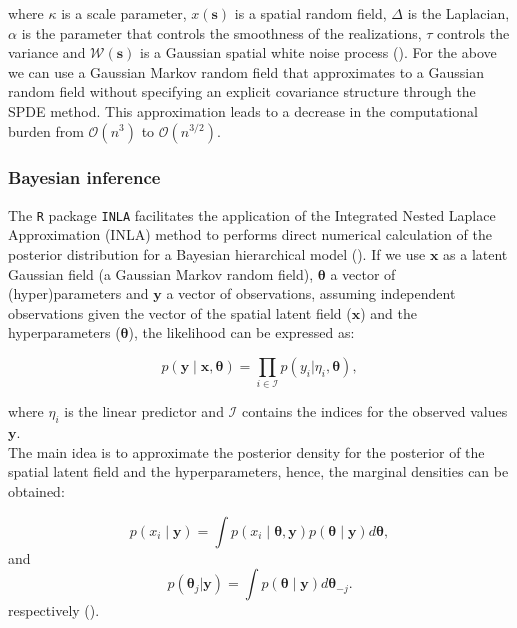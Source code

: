 \documentclass{article}
\begin{document}
where $\kappa$ is a scale parameter, $x(\boldsymbol{s})$ is a spatial random field, $\Delta$ is the Laplacian, $\alpha$ is the parameter that controls the smoothness of the realizations, $\tau$ controls the variance and $\boldsymbol{\mathcal{W}(s)}$  is a Gaussian spatial white noise process (\cite{lindgren2015bayesian}). For the above we can use a Gaussian Markov random field that approximates to a Gaussian random field without specifying an explicit covariance structure through the SPDE method. This approximation leads to a decrease in the computational burden from $\mathcal{O}(n^{3})$ to $\mathcal{O}(n^{3/2})$. 


\subsubsection{Bayesian inference}

 The \texttt{R} package \texttt{INLA} facilitates the application of the Integrated Nested Laplace Approximation (INLA) method to performs direct numerical calculation of the posterior distribution for a Bayesian hierarchical model (\cite{rue2009approximate}\cite{martino2009implementing}). If we use $\boldsymbol{x}$ as a latent Gaussian field (a Gaussian Markov random field), $\boldsymbol{\theta}$ a vector of (hyper)parameters and $\boldsymbol{y}$ a vector of observations, assuming independent observations given the vector of the spatial latent field ($\boldsymbol{x}$) and the hyperparameters ($\boldsymbol{\theta}$), the likelihood can be expressed as:

\begin{equation} \label{eqn:eq2}
p(\boldsymbol{y}\mid \boldsymbol{x},\boldsymbol{\theta}) =\prod_{i\in \mathcal{I}} p(y_i|\eta_i,\boldsymbol{\theta}),
\end{equation}

where $\eta_{i}$ is the linear predictor and $\mathcal{I}$ contains the indices for the observed values $\boldsymbol{y}$.  \\

The main idea is to approximate the posterior density for the posterior of the spatial latent field and the hyperparameters, hence, the marginal densities can be obtained:

\begin{equation} \label{eqn:eq3}
p(x_i \mid \boldsymbol{y}) = \int p(x_i \mid \boldsymbol{\theta},\boldsymbol{y})  p(\boldsymbol{\theta} \mid \boldsymbol{y}) d\boldsymbol{\theta},
\end{equation}
and
\begin{equation} \label{eqn:eq4}
p(\boldsymbol{\theta}_j|\boldsymbol{y}) = \int p(\boldsymbol{\theta} \mid \boldsymbol{y})  d\boldsymbol{\theta}_{-j}.
\end{equation}
respectively (\cite{lindgren2015bayesian}\cite{krainski2018advanced}). \\
\end{document}
